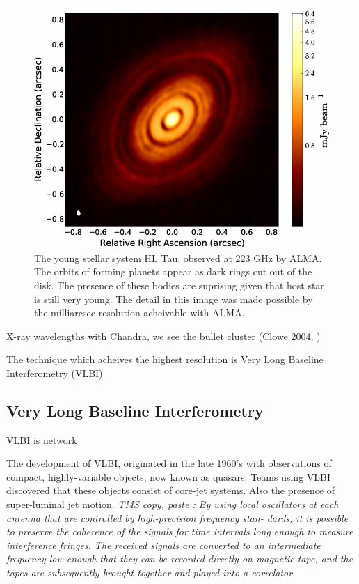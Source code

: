 \begin{figure}
\begin{center}

\includegraphics[width=1.4\columnwidth]{Images/hl_tau}
\caption{The young stellar system HL Tau, observed at 223 GHz by ALMA. The orbits of forming planets appear as dark rings cut out of the disk. The presence of these bodies are suprising given that host star is still very young. The detail in this image was made possible by the milliarcsec resolution acheivable with ALMA. \label{fig:hl_tau}}

\end{center}
\end{figure}

X-ray wavelengths with Chandra, we see the bullet cluster (Clowe 2004, )

The technique which acheives the highest resolution is Very Long Baseline Interferometry (VLBI)

\subsection{Very Long Baseline Interferometry}

VLBI is  network 

The development of VLBI, originated in the late 1960's with observations of compact, highly-variable objects, now known as quasars. Teams using VLBI discovered that these objects consist of core-jet systems. Also the presence of super-luminal jet motion. \textit{TMS copy, paste : By using local
oscillators at each antenna that are controlled by high-precision frequency stan-
dards, it is possible to preserve the coherence of the signals for time intervals
long enough to measure interference fringes. The received signals are converted
to an intermediate frequency low enough that they can be recorded directly on
magnetic tape, and the tapes are subsequently brought together and played into
a correlator.}

